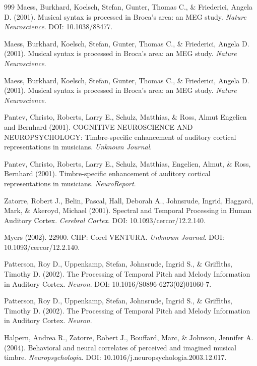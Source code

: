 \documentclass[9pt,onecolumn]{article}
\begin{document}
\begin{thebibliography}{999}
Maess, Burkhard, Koelsch, Stefan, Gunter, Thomas C., \& Friederici, Angela D. (2001). Musical syntax is processed in Broca's area: an MEG study. \textit{Nature Neuroscience}. DOI: 10.1038/88477.

Maess, Burkhard, Koelsch, Stefan, Gunter, Thomas C., \& Friederici, Angela D. (2001). Musical syntax is processed in Broca's area: an MEG study. \textit{Nature Neuroscience}.

Maess, Burkhard, Koelsch, Stefan, Gunter, Thomas C., \& Friederici, Angela D. (2001). Musical syntax is processed in Broca's area: an MEG study. \textit{Nature Neuroscience}.

Pantev, Christo, Roberts, Larry E., Schulz, Matthias, \& Ross, Almut Engelien and Bernhard (2001). COGNITIVE NEUROSCIENCE AND NEUROPSYCHOLOGY: Timbre-specific enhancement of auditory cortical representations in musicians. \textit{Unknown Journal}.

Pantev, Christo, Roberts, Larry E., Schulz, Matthias, Engelien, Almut, \& Ross, Bernhard (2001). Timbre-specific enhancement of auditory cortical representations in musicians. \textit{NeuroReport}.

Zatorre, Robert J., Belin, Pascal, Hall, Deborah A., Johnsrude, Ingrid, Haggard, Mark, \& Akeroyd, Michael (2001). Spectral and Temporal Processing in Human Auditory Cortex. \textit{Cerebral Cortex}. DOI: 10.1093/cercor/12.2.140.

Myers (2002). 22900. CHP: Corel VENTURA. \textit{Unknown Journal}. DOI: 10.1093/cercor/12.2.140.

Patterson, Roy D., Uppenkamp, Stefan, Johnsrude, Ingrid S., \& Griffiths, Timothy D. (2002). The Processing of Temporal Pitch and Melody Information in Auditory Cortex. \textit{Neuron}. DOI: 10.1016/S0896-6273(02)01060-7.

Patterson, Roy D., Uppenkamp, Stefan, Johnsrude, Ingrid S., \& Griffiths, Timothy D. (2002). The Processing of Temporal Pitch and Melody Information in Auditory Cortex. \textit{Neuron}.

Halpern, Andrea R., Zatorre, Robert J., Bouffard, Marc, \& Johnson, Jennifer A. (2004). Behavioral and neural correlates of perceived and imagined musical timbre. \textit{Neuropsychologia}. DOI: 10.1016/j.neuropsychologia.2003.12.017.


\end{thebibliography}
\end{document}
